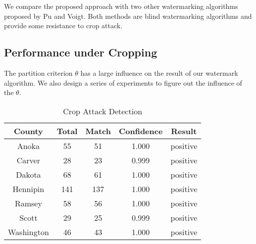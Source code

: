 \documentclass[
	paper=128mm:96mm,	%
	fontsize=11pt,					%
	pagesize,							%
	parskip=half-,					%
	numbers=noendperiod,	%
	captions=nooneline			%
	]{scrartcl}							%
\theoremstyle{mythmstyle}
\begin{document}
We compare the proposed approach with two other 
watermarking algorithms proposed by Pu\cite{PuDJ06} and 
Voigt\cite{Voigt:2003}. Both methods are blind watermarking algorithms and provide some resistance to crop attack.
\clearpage
\subsection*{Performance under Cropping}
The partition criterion $\theta $ has a large influence on the result of our watermark algorithm. We also design a series of experiments to figure out the influence of the $\theta $. 
\clearpage

\begin{table}[h]
\centering
\label{tab:crop}
\begin{tabular}{|c||c|c|c|c|} 
\hline
County & Total & Match & Confidence & Result \\\hline \hline
Anoka & 55 & 51 & 1.000 & positive\\\hline
Carver & 28 & 23 & 0.999 & positive\\\hline
Dakota & 68 & 61 & 1.000 & positive\\\hline
Hennipin & 141 & 137 & 1.000 & positive\\\hline
Ramsey & 58 & 56 & 1.000 & positive\\\hline
Scott & 29 & 25 & 0.999 & positive\\\hline
Washington & 46 & 43 & 1.000 & positive\\\hline
\end{tabular}
\caption{Crop Attack Detection}
\end{table}
\clearpage

\clearpage

\begin{figure}[h]
\centering
{}
\\
\label{fig:pudd}
\end{figure}

\clearpage
\end{document}

